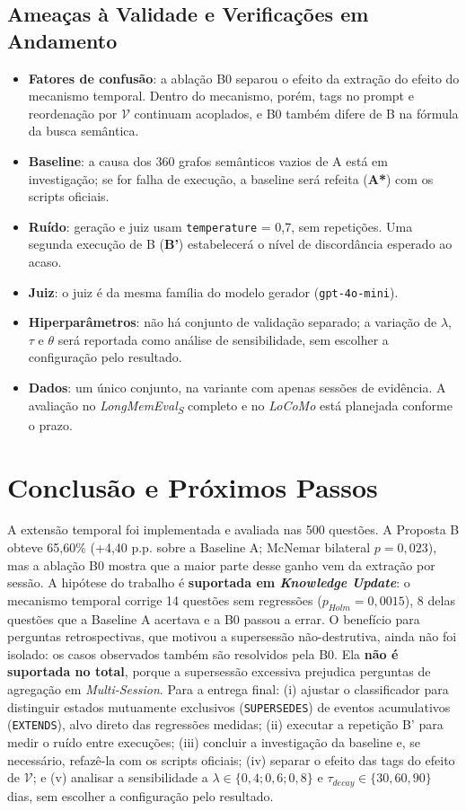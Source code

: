 \documentclass[10pt,conference,twocolumn]{IEEEtran}
\begin{document}
\subsection{Ameaças à Validade e Verificações em Andamento}
\label{sec:ameacas}
\begin{itemize}
    \item \textbf{Fatores de confusão}: a ablação B0 separou o efeito da extração do efeito do mecanismo temporal. Dentro do mecanismo, porém, tags no prompt e reordenação por $\mathcal{V}$ continuam acoplados, e B0 também difere de B na fórmula da busca semântica.
    \item \textbf{Baseline}: a causa dos 360 grafos semânticos vazios de A está em investigação; se for falha de execução, a baseline será refeita (\textbf{A*}) com os scripts oficiais.
    \item \textbf{Ruído}: geração e juiz usam \texttt{temperature} = 0,7, sem repetições. Uma segunda execução de B (\textbf{B'}) estabelecerá o nível de discordância esperado ao acaso.
    \item \textbf{Juiz}: o juiz é da mesma família do modelo gerador (\texttt{gpt-4o-mini}).
    \item \textbf{Hiperparâmetros}: não há conjunto de validação separado; a variação de $\lambda$, $\tau$ e $\theta$ será reportada como análise de sensibilidade, sem escolher a configuração pelo resultado.
    \item \textbf{Dados}: um único conjunto, na variante com apenas sessões de evidência. A avaliação no \textit{LongMemEval\textsubscript{S}} completo e no \textit{LoCoMo} está planejada conforme o prazo.
\end{itemize}

\section{Conclusão e Próximos Passos}
A extensão temporal foi implementada e avaliada nas 500 questões. A Proposta B obteve 65,60\% (+4,40 p.p. sobre a Baseline A; McNemar bilateral $p = 0{,}023$), mas a ablação B0 mostra que a maior parte desse ganho vem da extração por sessão. A hipótese do trabalho é \textbf{suportada em \textit{Knowledge Update}}: o mecanismo temporal corrige 14 questões sem regressões ($p_{Holm} = 0{,}0015$), 8 delas questões que a Baseline A acertava e a B0 passou a errar. O benefício para perguntas retrospectivas, que motivou a supersessão não-destrutiva, ainda não foi isolado: os casos observados também são resolvidos pela B0. Ela \textbf{não é suportada no total}, porque a supersessão excessiva prejudica perguntas de agregação em \textit{Multi-Session}. Para a entrega final: (i) ajustar o classificador para distinguir estados mutuamente exclusivos (\texttt{SUPERSEDES}) de eventos acumulativos (\texttt{EXTENDS}), alvo direto das regressões medidas; (ii) executar a repetição B' para medir o ruído entre execuções; (iii) concluir a investigação da baseline e, se necessário, refazê-la com os scripts oficiais; (iv) separar o efeito das tags do efeito de $\mathcal{V}$; e (v) analisar a sensibilidade a $\lambda \in \{0{,}4; 0{,}6; 0{,}8\}$ e $\tau_{decay} \in \{30, 60, 90\}$ dias, sem escolher a configuração pelo resultado.
\end{document}
